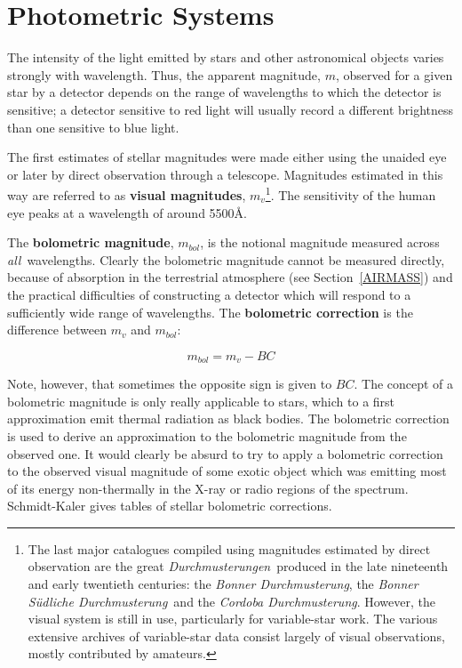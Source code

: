 \documentclass[twoside,11pt,nolof]{starlink}
\begin{document}
\section{\label{PHOTOSYS}Photometric Systems}

The intensity of the light emitted by stars and other astronomical
objects varies strongly with wavelength.  Thus, the apparent magnitude,
$m$, observed for a given star by a detector depends on the range of
wavelengths to which the detector is sensitive; a detector sensitive
to red light will usually record a different brightness than one
sensitive to blue light.

The first estimates of stellar magnitudes were made either using the
unaided eye or later by direct observation through a telescope.
Magnitudes estimated in this way are referred to as \textbf{visual
magnitudes}, $m_{v}$\footnote{The last major catalogues compiled using
magnitudes estimated by direct observation are the great \textit{Durchmusterungen}\, produced in the late nineteenth and early twentieth
centuries: the \textit{Bonner Durchmusterung}, the \textit{Bonner S\"{u}dliche
Durchmusterung}\, and the \textit{Cordoba Durchmusterung}.  However, the
visual system is still in use, particularly for variable-star work.
The various extensive archives of variable-star data consist largely of
visual observations, mostly contributed by amateurs.}.  The sensitivity
of the human eye peaks at a wavelength of around 5500\AA.

The \textbf{bolometric magnitude}, $m_{bol}$, is the notional magnitude
measured across \textit{all}\, wavelengths.  Clearly the bolometric magnitude
cannot be measured directly, because of absorption in the terrestrial
atmosphere (see Section~\ref{AIRMASS}) and the practical difficulties
of constructing a detector which will respond to a sufficiently wide
range of wavelengths.  The \textbf{bolometric correction} is the difference
between $m_{v}$ and $m_{bol}$:

\begin{equation}
m_{bol}=m_v - BC
\end{equation}

Note, however, that sometimes the opposite sign is given to $BC$.
The concept of a bolometric magnitude is only really applicable to
stars, which to a first approximation emit thermal radiation as black
bodies.  The bolometric correction is used to derive an approximation
to the bolometric magnitude from the observed one.  It would clearly
be absurd to try to apply a bolometric correction to the observed visual
magnitude of some exotic object which was emitting most of its energy
non-thermally in the X-ray or radio regions of the spectrum.
Schmidt-Kaler\cite{SCHMIDTKALER82} gives tables of stellar bolometric
corrections.
\end{document}
